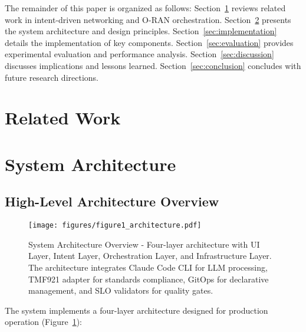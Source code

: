 \documentclass[conference]{IEEEtran}
\begin{document}
The remainder of this paper is organized as follows: Section~\ref{sec:related} reviews related work in intent-driven networking and O-RAN orchestration. Section~\ref{sec:architecture} presents the system architecture and design principles. Section~\ref{sec:implementation} details the implementation of key components. Section~\ref{sec:evaluation} provides experimental evaluation and performance analysis. Section~\ref{sec:discussion} discusses implications and lessons learned. Section~\ref{sec:conclusion} concludes with future research directions.


\section{Related Work}
\label{sec:related}




\section{System Architecture}
\label{sec:architecture}

\subsection{High-Level Architecture Overview}

\begin{figure}[!t]
\centering
\texttt{[image: figures/figure1\_architecture.pdf]}
\caption{System Architecture Overview - Four-layer architecture with UI Layer, Intent Layer, Orchestration Layer, and Infrastructure Layer. The architecture integrates Claude Code CLI for LLM processing, TMF921 adapter for standards compliance, GitOps for declarative management, and SLO validators for quality gates.}
\label{fig:architecture}
\end{figure}

The system implements a four-layer architecture designed for production operation (Figure~\ref{fig:architecture}):
\end{document}
